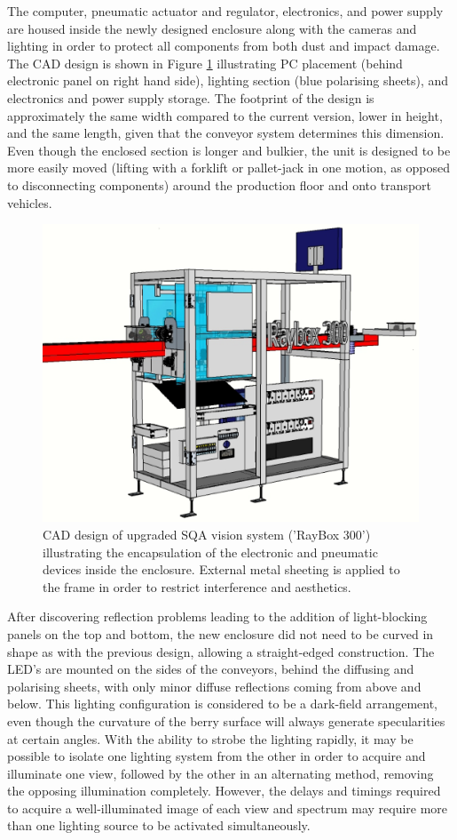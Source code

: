 \documentclass[fleqn,twoside,12pt]{report}
\begin{document}
The computer, pneumatic actuator and regulator, electronics, and power supply are housed inside the newly designed enclosure along with the cameras and lighting in order to protect all components from both dust and impact damage. The CAD design is shown in Figure \ref{fig:SQA_v2} illustrating PC placement (behind electronic panel on right hand side), lighting section (blue polarising sheets), and electronics and power supply storage. The footprint of the design is approximately the same width compared to the current version, lower in height, and the same length, given that the conveyor system determines this dimension. Even though the enclosed section is longer and bulkier, the unit is designed to be more easily moved (lifting with a forklift or pallet-jack in one motion, as opposed to disconnecting components) around the production floor and onto transport vehicles. 


\begin{figure}[h]
	\centering
	\includegraphics[width=.8\linewidth]{SQA_v2.png}
	\caption{CAD design of upgraded SQA vision system ('RayBox 300') illustrating the encapsulation of the electronic and pneumatic devices inside the enclosure. External metal sheeting is applied to the frame in order to restrict interference and aesthetics.}
	\label{fig:SQA_v2}
\end{figure}%


After discovering reflection problems leading to the addition of light-blocking panels on the top and bottom, the new enclosure did not need to be curved in shape as with the previous design, allowing a straight-edged construction. The LED's are mounted on the sides of the conveyors, behind the diffusing and polarising sheets, with only minor diffuse reflections coming from above and below. This lighting configuration is considered to be a dark-field arrangement, even though the curvature of the berry surface will always generate specularities at certain angles. With the ability to strobe the lighting rapidly, it may be possible to isolate one lighting system from the other in order to acquire and illuminate one view, followed by the other in an alternating method, removing the opposing illumination completely. However, the delays and timings required to acquire a well-illuminated image of each view and spectrum may require more than one lighting source to be activated simultaneously.
\end{document}
